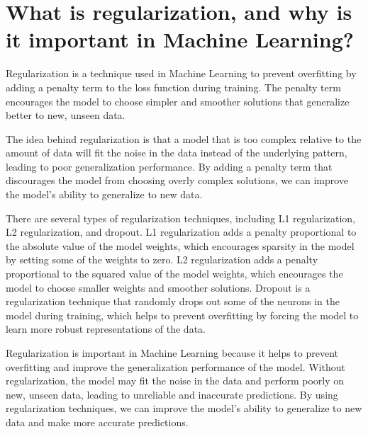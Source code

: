 \section{What is regularization, and why is it important in Machine Learning?}
Regularization is a technique used in Machine Learning to prevent overfitting by adding a penalty term to the loss function during training. The penalty term encourages the model to choose simpler and smoother solutions that generalize better to new, unseen data.

The idea behind regularization is that a model that is too complex relative to the amount of data will fit the noise in the data instead of the underlying pattern, leading to poor generalization performance. By adding a penalty term that discourages the model from choosing overly complex solutions, we can improve the model's ability to generalize to new data.

There are several types of regularization techniques, including L1 regularization, L2 regularization, and dropout. L1 regularization adds a penalty proportional to the absolute value of the model weights, which encourages sparsity in the model by setting some of the weights to zero. L2 regularization adds a penalty proportional to the squared value of the model weights, which encourages the model to choose smaller weights and smoother solutions. Dropout is a regularization technique that randomly drops out some of the neurons in the model during training, which helps to prevent overfitting by forcing the model to learn more robust representations of the data.

Regularization is important in Machine Learning because it helps to prevent overfitting and improve the generalization performance of the model. Without regularization, the model may fit the noise in the data and perform poorly on new, unseen data, leading to unreliable and inaccurate predictions. By using regularization techniques, we can improve the model's ability to generalize to new data and make more accurate predictions.

